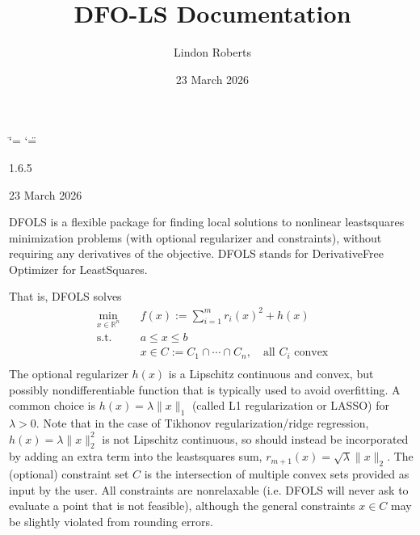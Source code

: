\documentclass[letterpaper,10pt,english]{sphinxmanual}
\title{DFO-LS Documentation}
\date{23 March 2026}
\author{Lindon Roberts}
\begin{document}
\ifdefined\shorthandoff
  \ifnum\catcode`\=\string=\active\shorthandoff{=}\fi
  \ifnum\catcode`\"=\active{}\fi
\fi

\pagestyle{empty}
\sphinxmaketitle
\pagestyle{plain}
\sphinxtableofcontents
\pagestyle{normal}
\label{\detokenize{index::doc}}


\sphinxAtStartPar
{} 1.6.5

\sphinxAtStartPar
{} 23 March 2026

\sphinxAtStartPar
{} 

\sphinxAtStartPar
DFO\sphinxhyphen{}LS is a flexible package for finding local solutions to nonlinear least\sphinxhyphen{}squares minimization problems (with optional regularizer and constraints), without requiring any derivatives of the objective. DFO\sphinxhyphen{}LS stands for Derivative\sphinxhyphen{}Free Optimizer for Least\sphinxhyphen{}Squares.

\sphinxAtStartPar
That is, DFO\sphinxhyphen{}LS solves
\begin{equation*}
\begin{split}\min_{x\in\mathbb{R}^n}  &\quad  f(x) := \sum_{i=1}^{m}r_{i}(x)^2 + h(x) \\
\text{s.t.} &\quad  a \leq x \leq b\\
            &\quad x \in C := C_1 \cap \cdots \cap C_n, \quad \text{all $C_i$ convex}\\\end{split}
\end{equation*}
\sphinxAtStartPar
The optional regularizer \(h(x)\) is a Lipschitz continuous and convex, but possibly non\sphinxhyphen{}differentiable function that is typically used to avoid overfitting.
A common choice is \(h(x)=\lambda \|x\|_1\) (called L1 regularization or LASSO) for \(\lambda>0\).
Note that in the case of Tikhonov regularization/ridge regression, \(h(x)=\lambda\|x\|_2^2\) is not Lipschitz continuous, so should instead be incorporated by adding an extra term into the least\sphinxhyphen{}squares sum, \(r_{m+1}(x)=\sqrt{\lambda} \|x\|_2\).
The (optional) constraint set \(C\) is the intersection of multiple convex sets provided as input by the user. All constraints are non\sphinxhyphen{}relaxable (i.e. DFO\sphinxhyphen{}LS will never ask to evaluate a point that is not feasible), although the general constraints \(x\in C\) may be slightly violated from rounding errors.
\end{document}
